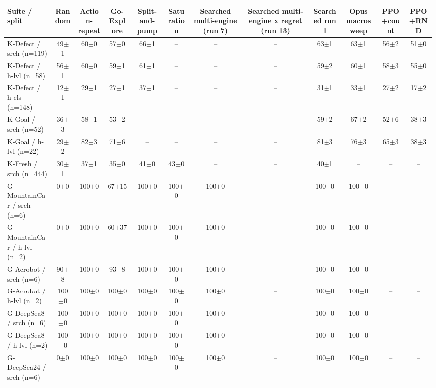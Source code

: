 \begin{table}[t]\centering\footnotesize
\begin{tabular}{lccccccccccc}
\toprule
Suite / split & Random & Action-repeat & Go-Explore & Split-and-pump & Saturation & Searched multi-engine (run 7) & Searched multi-engine x regret (run 13) & Searched run 1 & Opus macrosweep & PPO+count & PPO+RND \\
\midrule
K-Defect / srch (n=119) & 49$\pm$1 & 60$\pm$0 & 57$\pm$0 & 66$\pm$1 & -- & -- & -- & 63$\pm$1 & 63$\pm$1 & 56$\pm$2 & 51$\pm$0 \\
K-Defect / h-lvl (n=58) & 56$\pm$1 & 60$\pm$0 & 59$\pm$1 & 61$\pm$1 & -- & -- & -- & 59$\pm$2 & 60$\pm$1 & 58$\pm$3 & 55$\pm$0 \\
K-Defect / h-cls (n=148) & 12$\pm$1 & 29$\pm$1 & 27$\pm$1 & 37$\pm$1 & -- & -- & -- & 31$\pm$1 & 33$\pm$1 & 27$\pm$2 & 17$\pm$2 \\
K-Goal / srch (n=52) & 36$\pm$3 & 58$\pm$1 & 53$\pm$2 & -- & -- & -- & -- & 59$\pm$2 & 67$\pm$2 & 52$\pm$6 & 38$\pm$3 \\
K-Goal / h-lvl (n=22) & 29$\pm$2 & 82$\pm$3 & 71$\pm$6 & -- & -- & -- & -- & 81$\pm$3 & 76$\pm$3 & 65$\pm$3 & 38$\pm$3 \\
K-Fresh / srch (n=444) & 30$\pm$1 & 37$\pm$1 & 35$\pm$0 & 41$\pm$0 & 43$\pm$0 & -- & -- & 40$\pm$1 & -- & -- & -- \\
G-MountainCar / srch (n=6) & 0$\pm$0 & 100$\pm$0 & 67$\pm$15 & 100$\pm$0 & 100$\pm$0 & 100$\pm$0 & -- & 100$\pm$0 & 100$\pm$0 & -- & -- \\
G-MountainCar / h-lvl (n=2) & 0$\pm$0 & 100$\pm$0 & 60$\pm$37 & 100$\pm$0 & 100$\pm$0 & 100$\pm$0 & -- & 100$\pm$0 & 100$\pm$0 & -- & -- \\
G-Acrobot / srch (n=6) & 90$\pm$8 & 100$\pm$0 & 93$\pm$8 & 100$\pm$0 & 100$\pm$0 & 100$\pm$0 & -- & 100$\pm$0 & 100$\pm$0 & -- & -- \\
G-Acrobot / h-lvl (n=2) & 100$\pm$0 & 100$\pm$0 & 100$\pm$0 & 100$\pm$0 & 100$\pm$0 & 100$\pm$0 & -- & 100$\pm$0 & 100$\pm$0 & -- & -- \\
G-DeepSea8 / srch (n=6) & 100$\pm$0 & 100$\pm$0 & 100$\pm$0 & 100$\pm$0 & 100$\pm$0 & 100$\pm$0 & -- & 100$\pm$0 & 100$\pm$0 & -- & -- \\
G-DeepSea8 / h-lvl (n=2) & 100$\pm$0 & 100$\pm$0 & 100$\pm$0 & 100$\pm$0 & 100$\pm$0 & 100$\pm$0 & -- & 100$\pm$0 & 100$\pm$0 & -- & -- \\
G-DeepSea24 / srch (n=6) & 0$\pm$0 & 100$\pm$0 & 100$\pm$0 & 100$\pm$0 & 100$\pm$0 & 100$\pm$0 & -- & 100$\pm$0 & 100$\pm$0 & -- & -- \\

\end{tabular}
\end{table}
